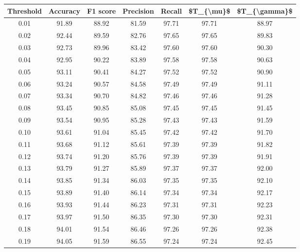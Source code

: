 \begin{tabular}{|c|c|c|c|c|c|c|}
\hline
 Threshold &  Accuracy &  F1 score &  Precision &  Recall &  \$T\_\{\textbackslash mu\}\$ &  \$T\_\{\textbackslash gamma\}\$ \\
\hline
      0.01 &     91.89 &     88.92 &      81.59 &   97.71 &      97.71 &         88.97 \\
      0.02 &     92.44 &     89.59 &      82.76 &   97.65 &      97.65 &         89.83 \\
      0.03 &     92.73 &     89.96 &      83.42 &   97.60 &      97.60 &         90.30 \\
      0.04 &     92.95 &     90.22 &      83.89 &   97.58 &      97.58 &         90.63 \\
      0.05 &     93.11 &     90.41 &      84.27 &   97.52 &      97.52 &         90.90 \\
      0.06 &     93.24 &     90.57 &      84.58 &   97.49 &      97.49 &         91.11 \\
      0.07 &     93.34 &     90.70 &      84.82 &   97.46 &      97.46 &         91.28 \\
      0.08 &     93.45 &     90.85 &      85.08 &   97.45 &      97.45 &         91.45 \\
      0.09 &     93.54 &     90.95 &      85.28 &   97.43 &      97.43 &         91.59 \\
      0.10 &     93.61 &     91.04 &      85.45 &   97.42 &      97.42 &         91.70 \\
      0.11 &     93.68 &     91.12 &      85.61 &   97.39 &      97.39 &         91.82 \\
      0.12 &     93.74 &     91.20 &      85.76 &   97.39 &      97.39 &         91.91 \\
      0.13 &     93.79 &     91.27 &      85.89 &   97.37 &      97.37 &         92.00 \\
      0.14 &     93.85 &     91.34 &      86.03 &   97.35 &      97.35 &         92.10 \\
      0.15 &     93.89 &     91.40 &      86.14 &   97.34 &      97.34 &         92.17 \\
      0.16 &     93.93 &     91.44 &      86.23 &   97.31 &      97.31 &         92.23 \\
      0.17 &     93.97 &     91.50 &      86.35 &   97.30 &      97.30 &         92.31 \\
      0.18 &     94.01 &     91.54 &      86.46 &   97.26 &      97.26 &         92.38 \\
      0.19 &     94.05 &     91.59 &      86.55 &   97.24 &      97.24 &         92.45 \\

\end{tabular}
